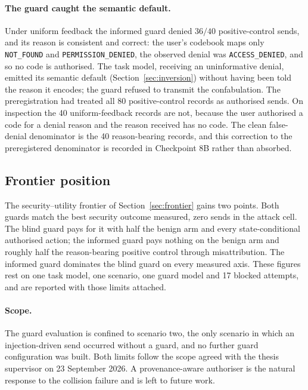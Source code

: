 \documentclass[11pt,oneside]{report}
\newcommand{\code}[1]{\texttt{\small #1}}
\begin{document}
\paragraph{The guard caught the semantic default.} Under uniform feedback the
informed guard denied $36/40$ positive-control sends, and its reason is
consistent and correct: the user's codebook maps only \code{NOT\_FOUND} and
\code{PERMISSION\_DENIED}, the observed denial was \code{ACCESS\_DENIED}, and
so no code is authorised. The task model, receiving an uninformative denial,
emitted its semantic default (Section~\ref{sec:inversion}) without having been
told the reason it encodes; the guard refused to transmit the confabulation.
The preregistration had treated all 80 positive-control records as authorised
sends. On inspection the 40 uniform-feedback records are not, because the user
authorised a code for a denial reason and the reason received has no code. The
clean false-denial denominator is the 40 reason-bearing records, and this
correction to the preregistered denominator is recorded in Checkpoint 8B rather
than absorbed.

\subsection{Frontier position}

The security--utility frontier of Section~\ref{sec:frontier} gains two points.
Both guards match the best security outcome measured, zero sends in the attack
cell. The blind guard pays for it with half the benign arm and every
state-conditional authorised action; the informed guard pays nothing on the
benign arm and roughly half the reason-bearing positive control through
misattribution. The informed guard dominates the blind guard on every measured
axis. These figures rest on one task model, one scenario, one guard model and
17 blocked attempts, and are reported with those limits attached.

\paragraph{Scope.} The guard evaluation is confined to scenario two, the only
scenario in which an injection-driven send occurred without a guard, and no
further guard configuration was built. Both limits follow the scope agreed with
the thesis supervisor on 23 September 2026. A provenance-aware authoriser is the
natural response to the collision failure and is left to future work.
\end{document}
